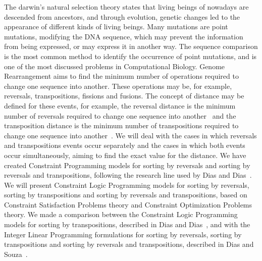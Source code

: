 The darwin's natural selection theory states that living beings of
nowadays are descended from ancestors, and through evolution, genetic
changes led to the appearance of different kinds of living beings. Many
mutations are point mutations, modifying the DNA sequence, which may
prevent the information from being expressed, or may express it in
another way. The sequence comparison is the most common method to
identify the occurrence of point mutations, and is one of the most
discussed problems in Computational Biology. Genome Rearrangement aims
to find the minimum number of operations required to change one sequence
into another. These operations may be, for example, reversals,
transpositions, fissions and fusions. The concept of distance may be
defined for these events, for example, the reversal distance is the
minimum number of reversals required to change one sequence into
another~\cite{BafnaPevzner*1996} and the transposition distance is the
minimum number of transpositions required to change one sequence into
another~\cite{BafnaPevzner*1998}. We will deal with the cases in which
reversals and transpositions events occur separately and the cases in
which both events occur simultaneously, aiming to find the exact value
for the distance. We have created Constraint Programming models for
sorting by reversals and sorting by reversals and transpositions,
following the research line used by Dias and Dias~\cite{DiasDias*2009}.
We will present Constraint Logic Programming models for sorting by
reversals, sorting by transpositions and sorting by reversals and
transpositions, based on Constraint Satisfaction Problems theory and
Constraint Optimization Problems theory. We made a comparison between
the Constraint Logic Programming models for sorting by transpositions,
described in Dias and Dias~\cite{DiasDias*2009}, and with the Integer
Linear Programming formulations for sorting by reversals, sorting by
transpositions and sorting by reversals and transpositions, described in
Dias and Souza~\cite{DiasSouza*2007}.

